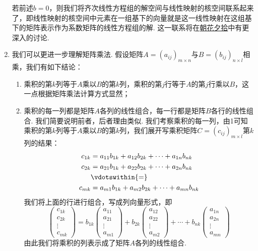 \begin{enumerate}
          若前述$b=0$，则我们将齐次线性方程组的解空间与线性映射的核空间联系起来了，即线性映射的核空间中元素在一组基下的向量就是这一线性映射在这组基下的矩阵表示作为系数矩阵的线性方程组的解. 这一联系将在\hyperref[chap:朝花夕拾]{朝花夕拾}中有更深入的讨论.

    \item 我们可以更进一步理解矩阵乘法. 假设矩阵$A=(a_{ij})_{m\times n}$与$B=(b_{ij})_{n\times l}$相乘，我们有如下结论：
          \begin{enumerate}
              \item 乘积的第$k$列等于$A$乘以$B$的第$k$列，乘积的第$j$行等于$A$的第$j$行乘以$B$，这一点根据矩阵乘法计算方式显然；

              \item 乘积的每一列都是矩阵$A$各列的线性组合，每一行都是矩阵$B$各行的线性组合. 我们简要说明前者，后者理由类似. 我们考察乘积的每一列，由1可知乘积的第$k$列等于$A$乘以$B$的第$k$列，我们展开写乘积矩阵$C=(c_{ij})_{m\times l}$第$k$列的结果：
                    \begin{align*}
                        c_{1k} & =a_{11}b_{1k}+a_{12}b_{2k}+\cdots+a_{1n}b_{nk} \\
                        c_{2k} & =a_{21}b_{1k}+a_{22}b_{2k}+\cdots+a_{2n}b_{nk} \\
                               & \vdotswithin{=}                                \\
                        c_{mk} & =a_{m1}b_{1k}+a_{m2}b_{2k}+\cdots+a_{mn}b_{nk}
                    \end{align*}
                    我们将上面的行进行组合，写成列向量形式，即
                    \[\begin{pmatrix}
                            c_{1k} \\ c_{2k} \\ \vdots \\ c_{mk}
                        \end{pmatrix}=b_{1k}\begin{pmatrix}
                            a_{11} \\ a_{21} \\ \vdots \\ a_{m1}
                        \end{pmatrix}+b_{2k}\begin{pmatrix}
                            a_{12} \\ a_{22} \\ \vdots \\ a_{m2}
                        \end{pmatrix}+\cdots+b_{nk}\begin{pmatrix}
                            a_{1n} \\ a_{2n} \\ \vdots \\ a_{mn}
                        \end{pmatrix}\]
                    由此我们将乘积的列表示成了矩阵$A$各列的线性组合.
          \end{enumerate}


\end{enumerate}
